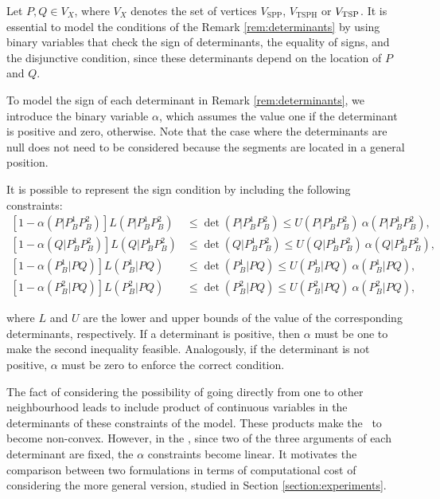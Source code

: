 \documentclass[a4paper,  review, authoryear, 1p.]{elsarticle}
\newcommand{\TSPHN}{{\sf{H-TSPHN}\xspace }}
\newcommand{\TSPN}{{\sf{H-TSPN}\xspace }}
\newcommand{\VSPP}{{V_{\text{SPP}}}}
\newcommand{\VTSPH}{{V_{\text{TSPH}}}}
\newcommand{\CV}[1]{{\color{red}#1}}
\newcommand{\determinant}[3]{\det({#1|#2#3})}
\begin{document}
	
	
	
	Let $P,Q\in V_X$, where $V_X$ denotes the set of vertices $\VSPP$, $\VTSPH$ or $V_{\rm{TSP}}$. It is essential to model the conditions of the Remark \ref{rem:determinants} by using binary variables that check the sign of determinants, the equality of signs, and the disjunctive condition, since these determinants depend on the location of $P$ and $Q$.
	
	\newcommand{\LS}[3]{L(#1|#2#3)}
	\newcommand{\US}[3]{U(#1|#2#3)}
	\newcommand{\alphamas}[3]{\alpha(#1|#2#3)}
	\newcommand{\alphamenos}[3]{\alpha^{-}(#1|#2#3)}
	\newcommand{\alphapunto}[3]{\alpha^{\cdotp}(#1|#2#3)}
	
	To model the sign of each determinant in Remark \ref{rem:determinants}, we introduce the binary variable $\alpha$, which assumes the value one if the determinant is positive and zero, otherwise. Note that the case where the determinants are null does not need to be considered because the segments are located in a general position.
	
	It is possible to represent the sign condition by including the following constraints:
	\begin{align*}\tag{$\alpha$-C}\label{eq:alphaC}
		\left[1-\alphamas{P}{P_B^1}{P_B^2}\right]\LS{P}{P_B^1}{P_B^2}&\leq\determinant{P}{P_B^1}{P_B^2}\leq \US{P}{P_B^1}{P_B^2}\:\alphamas{P}{P_B^1}{P_B^2},\\
		\left[1-\alphamas{Q}{P_B^1}{P_B^2}\right]\LS{Q}{P_B^1}{P_B^2}&\leq\determinant{Q}{P_B^1}{P_B^2}\leq \US{Q}{P_B^1}{P_B^2}\:\alphamas{Q}{P_B^1}{P_B^2},\\
		\left[1-\alphamas{P_B^1}{P}{Q}\right]\LS{P_B^1}{P}{Q}&\leq\determinant{P_B^1}{P}{Q}\leq \US{P_B^1}{P}{Q}\:\alphamas{P_B^1}{P}{Q},\\		\left[1-\alphamas{P_B^2}{P}{Q}\right]\LS{P_B^2}{P}{Q}&\leq\determinant{P_B^2}{P}{Q}\leq \US{P_B^2}{P}{Q}\:\alphamas{P_B^2}{P}{Q},
	\end{align*}
	
	\noindent where $L$ and $U$ are the lower and upper bounds of the value of the corresponding determinants, respectively. If a determinant is positive, then $\alpha$ must be one to make the second inequality feasible. Analogously, if the determinant is not positive, $\alpha$ must be zero to enforce the correct condition.
	
	\CV{The fact of considering the possibility of going directly from one to other neighbourhood leads to include product of continuous variables in the determinants of these constraints of the model. These products make the \TSPN \ to become non-convex. However, in the \TSPHN, since two of the three arguments of each determinant are fixed, the $\alpha$ constraints become linear. It motivates the comparison between two formulations in terms of computational cost of considering the more general version, studied in Section \ref{section:experiments}.}
	
\end{document}

